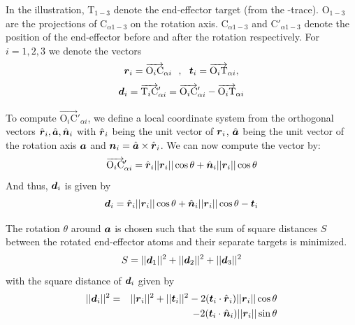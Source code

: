 In the illustration, T$_{1-3}$ denote the end-effector target (from the \Ca-trace). O$_{1-3}$ are the projections of C$_{\alpha1-3}$ on the rotation axis. C$_{\alpha1-3}$ and C$'_{\alpha1-3}$ denote the position of the end-effector before and after the rotation respectively.
For $i=1,2,3$ we denote the vectors
 $$\boldsymbol{r}_i = \overrightarrow{\text{O}_i\text{C}}_{\alpha i}~~,~~ \boldsymbol{t}_i = \overrightarrow{\text{O}_i\text{T}}_{\alpha i} , $$
$$\boldsymbol{d}_i = \overrightarrow{\text{T}_i\text{C}}'_{\alpha i} = \overrightarrow{\text{O}_i\text{C}}'_{\alpha i}-\overrightarrow{\text{O}_i\text{T}}_{\alpha i}$$

To compute $\overrightarrow{\text{O}_i\text{C}}'_{\alpha i}$, we define a local coordinate system from the orthogonal vectors $\hat{\boldsymbol{r}}_i, \hat{\boldsymbol{a}}, \hat{\boldsymbol{n}}_i$ with $\hat{\boldsymbol{r}}_i$ being the unit vector of $\boldsymbol{r}_i$, $\hat{\boldsymbol{a}}$ being the unit vector of the rotation axis $\boldsymbol{a}$ and $\boldsymbol{n}_i = \hat{\boldsymbol{a}} \times \hat{\boldsymbol{r}}_i$. We can now compute the vector by:
$$\overrightarrow{\text{O}_i\text{C}}'_{\alpha i} = \hat{\boldsymbol{r}}_i||\boldsymbol{r}_i||\cos\theta + \hat{\boldsymbol{n}}_i||\boldsymbol{r}_i||\cos\theta$$
And thus, $\boldsymbol{d}_i$ is given by
$$\boldsymbol{d}_i =  \hat{\boldsymbol{r}}_i||\boldsymbol{r}_i||\cos\theta + \hat{\boldsymbol{n}}_i||\boldsymbol{r}_i||\cos\theta - \boldsymbol{t}_i$$

The rotation $\theta$ around $\boldsymbol{a}$ is chosen such that the sum of square distances $S$ between the rotated end-effector atoms and their separate targets is minimized.
$$S=||\boldsymbol{d}_1||^2+||\boldsymbol{d}_2||^2+||\boldsymbol{d}_3||^2$$
with the square distance of $\boldsymbol{d}_i$ given by
\begin{eqnarray*}
||\boldsymbol{d}_i||^2 &=& ||\boldsymbol{r}_i||^2 + ||\boldsymbol{t}_i||^2 - 2(\boldsymbol{t}_i\cdot\hat{\boldsymbol{r}}_i)||\boldsymbol{r}_i||\cos\theta\\
&& - 2(\boldsymbol{t}_i\cdot\hat{\boldsymbol{n}}_i)||\boldsymbol{r}_i||\sin\theta
\end{eqnarray*}

